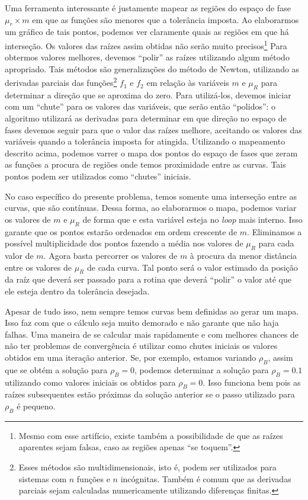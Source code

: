 Uma ferramenta interessante é justamente mapear as regiões do espaço de fase $\mu_r \times m$ em que as funções são menores que a tolerância imposta. Ao elaborarmos um gráfico de tais pontos, podemos ver claramente quais as regiões em que há interseção. Os valores das raízes assim obtidas não serão muito precisos\footnote{Mesmo com esse artifício, existe também a possibilidade de que as raízes aparentes sejam falsas, caso as regiões apenas ``se toquem''.} Para obtermos valores melhores, devemos ``polir'' as raízes utilizando algum método apropriado. Tais métodos são generalizações do método de Newton\cite{NumericalRecipes}, utilizando as derivadas parciais das funções\footnote{Esses métodos são multidimensionais, isto é, podem ser utilizados para sistemas com $n$ funções e $n$ incógnitas. Também é comum que as derivadas parciais sejam calculadas numericamente utilizando diferenças finitas.} $f_1$ e $f_2$ em relação às variáveis $m$ e $\mu_R$ para determinar a direção que se aproxima do zero. Para utilizá-los, devemos iniciar com um ``chute'' para os valores das variáveis, que serão então ``polidos'': o algoritmo utilizará as derivadas para determinar em que direção no espaço de fases devemos seguir para que o valor das raízes melhore, aceitando os valores das variáveis quando a tolerância imposta for atingida. Utilizando o mapeamento descrito acima, podemos varrer o mapa dos pontos do espaço de fases que zeram as funções a procura de regiões onde temos proximidade entre as curvas. Tais pontos podem ser utilizados como ``chutes'' iniciais.

No caso específico do presente problema, temos somente uma interseção entre as curvas, que são contínuas. Dessa forma, ao elaborarmos o mapa, podemos variar os valores de $m$ e $\mu_R$ de forma que e esta variável esteja no \emph{loop} mais interno. Isso garante que os pontos estarão ordenados em ordem crescente de $m$. Eliminamos a possível multiplicidade dos pontos fazendo a média nos valores de $\mu_R$ para cada valor de $m$. Agora basta percorrer os valores de $m$ à procura da menor distância entre os valores de $\mu_R$ de cada curva. Tal ponto será o valor estimado da posição da raíz que deverá ser passado para a rotina que deverá ``polir'' o valor até que ele esteja dentro da tolerância desejada.

Apesar de tudo isso, nem sempre temos curvas bem definidas ao gerar um mapa. Isso faz com que o cálculo seja muito demorado e não garante que não haja falhas. Uma maneira de se calcular mais rapidamente e com melhores chances de não ter problemas de convergência é utilizar como chutes iniciais os valores obtidos em uma iteração anterior. Se, por exemplo, estamos variando $\rho_B$, assim que se obtém a solução para $\rho_B = 0$, podemos determinar a solução para $\rho_B = 0.1$ utilizando como valores iniciais os obtidos para $\rho_B = 0$. Isso funciona bem pois as raízes subsequentes estão próximas da solução anterior se o passo utilizado para $\rho_B$ é pequeno.

